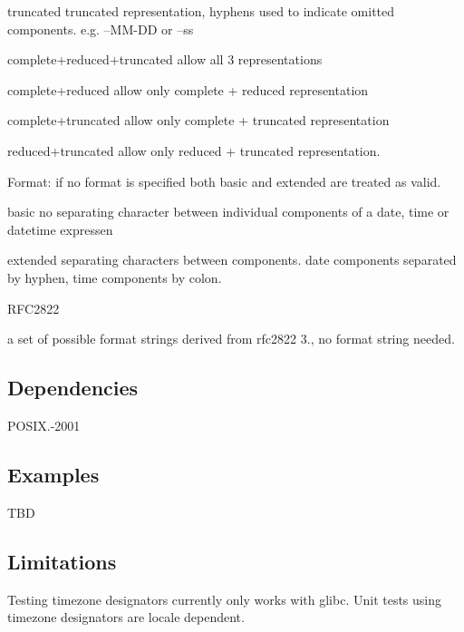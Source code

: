 \begin{DoxyItemize}
\begin{DoxyItemize}
\begin{DoxyItemize}
\item {\ttfamily truncated} truncated representation, hyphens used to indicate omitted components. e.\+g. --M\+M-\/\+DD or --ss
\item {\ttfamily complete+reduced+truncated} allow all 3 representations
\item {\ttfamily complete+reduced} allow only {\ttfamily complete} + {\ttfamily reduced} representation
\item {\ttfamily complete+truncated} allow only {\ttfamily complete} + {\ttfamily truncated} representation
\item {\ttfamily reduced+truncated} allow only {\ttfamily reduced} + {\ttfamily truncated} representation.
\end{DoxyItemize}
\item Format\+: if no format is specified both {\ttfamily basic} and {\ttfamily extended} are treated as valid.
\begin{DoxyItemize}
\item {\ttfamily basic} no separating character between individual components of a {\ttfamily date}, {\ttfamily time} or {\ttfamily datetime} expressen
\item {\ttfamily extended} separating characters between components. {\ttfamily date} components separated by hyphen, {\ttfamily time} components by colon.
\end{DoxyItemize}
\end{DoxyItemize}
\item {\ttfamily R\+F\+C2822}

a set of possible format strings derived from rfc2822 3., no format string needed.
\end{DoxyItemize}

\subsection*{Dependencies}

P\+O\+S\+I\+X.-\/2001

\subsection*{Examples}

T\+BD

\subsection*{Limitations}

Testing timezone designators currently only works with glibc. Unit tests using timezone designators are locale dependent. 